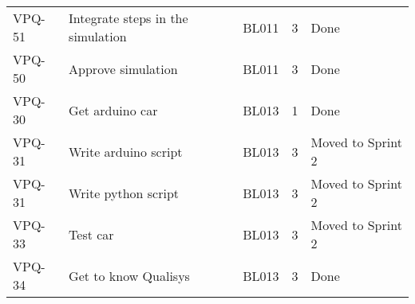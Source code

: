 \begin{table}[ht]
\begin{tabularx}{\linewidth}{|m{1.5cm} m{6.65cm} m{1.2cm} m{1.5cm} m{3.5cm}|}
            VPQ-51 & Integrate steps in the simulation & BL011 & 3\centering & Done  \\
\rowcolor{gainsboro}  VPQ-50 & Approve simulation & BL011 & 3\centering & Done  \\
            VPQ-30 & Get arduino car & BL013 & 1\centering & Done  \\
\rowcolor{gainsboro}  VPQ-31 & Write arduino script & BL013 & 3\centering & Moved to Sprint 2  \\
            VPQ-31 & Write python script & BL013 & 3\centering & Moved to Sprint 2  \\
\rowcolor{gainsboro}  VPQ-33 & Test car & BL013 & 3\centering & Moved to Sprint 2  \\
            VPQ-34 & Get to know Qualisys & BL013 & 3\centering & Done  \\
\hline    
\end{tabularx}
\end{table}
\newpage



